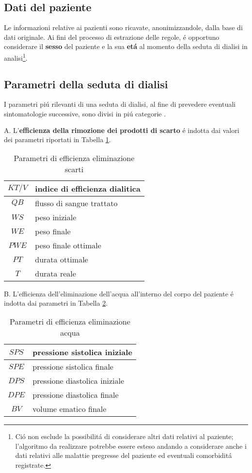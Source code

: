 \documentclass[preprint]{acm_proc_article-sp}
\begin{document}
\subsection{Dati del paziente}
Le informazioni relative ai pazienti sono ricavate, anonimizzandole, dalla base di dati originale. Ai fini del processo di estrazione delle regole, \'e opportuno considerare il \textbf{sesso} del paziente e la sua \textbf{et\'a} al momento della seduta di dialisi in analisi\footnote{Ci\'o non esclude la possibilit\'a di considerare altri dati relativi al paziente; l'algoritmo da realizzare potrebbe essere esteso andando a considerare anche i dati relativi alle malattie pregresse del paziente ed eventuali comorbidit\'a registrate.}.

\subsection{Parametri della seduta di dialisi}
I parametri pi\'u rilevanti di una seduta di dialisi, al fine di prevedere eventuali sintomatologie successive, sono divisi in pi\'u categorie \cite{bellazziintelligent}  \cite{pmid15749092}.

A. L'\textbf{efficienza della rimozione dei prodotti di scarto} \'e indotta dai valori dei parametri riportati in Tabella \ref{table:parametri-1}.

\begin{table}[h]
\centering
\begin{tabular}{|c|l|} \hline
$KT/V$ & indice di efficienza dialitica\\ \hline
$QB$ & flusso di sangue trattato\\ \hline
$WS$ & peso iniziale \\ \hline
$WE$ & peso finale \\ \hline
$PWE$ & peso finale ottimale \\ \hline
$PT$ & durata ottimale \\ \hline
$T$ & durata reale \\
\hline\end{tabular}
\caption{Parametri di efficienza eliminazione scarti}
\label{table:parametri-1}
\end{table}

B. L'efficienza dell'eliminazione dell'acqua all'interno del corpo del paziente \'e indotta dai parametri in Tabella \ref{table:parametri-2}.

\begin{table}[h]
\centering
\begin{tabular}{|c|l|} \hline
$SPS$ & pressione sistolica iniziale \\ \hline
$SPE$ & pressione sistolica finale \\ \hline
$DPS$ & pressione diastolica iniziale\\ \hline
$DPE$ & pressione diastolica finale\\ \hline
$BV$ & volume ematico finale\\
\hline\end{tabular}
\caption{Parametri di efficienza eliminazione acqua}
\label{table:parametri-2}
\end{table}
\end{document}
